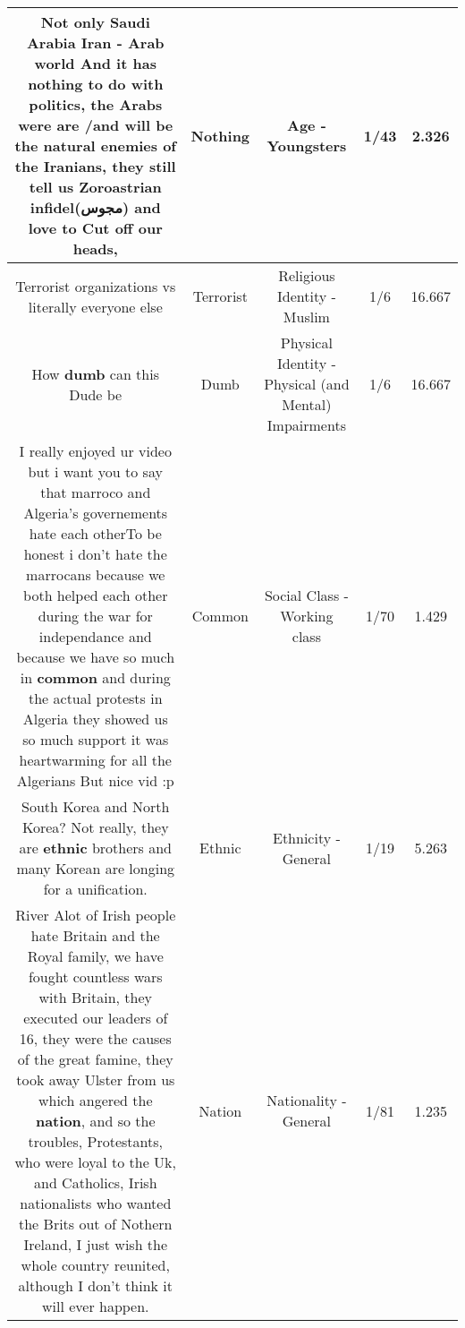 \documentclass[11pt]{article}
\newlength\mylength
\begin{document}
\begin{center}
\begin{longtable}{|C{.65\mylength}|C{.30\mylength}|C{.12\mylength}|C{.12\mylength}|C{.12\mylength}|}
  \small Not only Saudi Arabia Iran - Arab world And it has \textbf{nothing} to do with politics, the Arabs were  are /and will be the natural enemies of the Iranians, they still tell us Zoroastrian infidel(مجوس) and love to Cut off our heads,\normalsize   & Nothing & Age - Youngsters & 1/43 & 2.326 \\  \hline
  \small Terrorist organizations vs literally everyone else\normalsize   & Terrorist & Religious Identity - Muslim & 1/6 & 16.667 \\  \hline
  \small How \textbf{dumb} can this Dude be\normalsize   & Dumb & Physical Identity - Physical (and Mental) Impairments & 1/6 & 16.667 \\  \hline
  \small I really enjoyed ur video but i want you to say that  marroco and Algeria's governements hate each otherTo be honest i don't hate the marrocans because we both helped each other during the war for independance and because we have so much in \textbf{common} and during the actual protests in Algeria they showed us so much support it was heartwarming for all the Algerians But nice vid :p\normalsize   & Common & Social Class - Working class & 1/70 & 1.429 \\  \hline
  \small South Korea and North Korea? Not really, they are \textbf{ethnic} brothers and many Korean are longing for a unification.\normalsize   & Ethnic & Ethnicity - General & 1/19 & 5.263 \\  \hline
  \small {} River Alot of Irish people hate Britain and the Royal family, we have fought countless wars with Britain, they executed our leaders of 16, they were the causes of the great famine, they took away Ulster from us which angered the \textbf{nation}, and so the troubles, Protestants, who were loyal to the Uk, and Catholics, Irish nationalists who wanted the Brits out of Nothern Ireland, I just wish the whole country reunited, although I don't think it will ever happen.\normalsize   & Nation & Nationality - General & 1/81 & 1.235 \\  \hline

\end{longtable}
\end{center}
\end{document}
